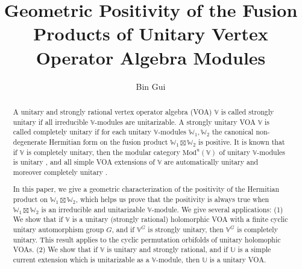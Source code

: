 \documentclass[11pt,b5paper,notitlepage]{article}
\title{Geometric Positivity of the Fusion Products of Unitary Vertex Operator Algebra Modules}
\author{{\sc Bin Gui}
}
\date{}
\theoremstyle{definition}
\theoremstyle{plain}
\newcommand{\uni}{\mathrm{u}}
\newcommand{\Vbb}{\mathbb V}
\newcommand{\Ubb}{\mathbb U}
\newcommand{\Wbb}{\mathbb W}
\newcommand{\Mod}{\mathrm{Mod}}
\numberwithin{equation}{section}
\begin{document}
\sloppy %
	\setcounter{section}{-1}
	






	
	\maketitle

\begin{abstract}
A unitary and strongly rational vertex operator algebra (VOA) $\Vbb$ is called strongly unitary if all irreducible $\Vbb$-modules are unitarizable. A strongly unitary VOA $\Vbb$ is called completely unitary if for each unitary $\Vbb$-modules $\Wbb_1,\Wbb_2$ the canonical non-degenerate Hermitian form on the fusion product $\Wbb_1\boxtimes\Wbb_2$ is positive. It is known that if $\Vbb$ is completely unitary, then the  modular category $\Mod^\uni(\Vbb)$ of unitary $\Vbb$-modules is unitary \cite{Gui19b}, and all simple VOA extensions of $\Vbb$ are automatically unitary and moreover completely unitary \cite{Gui22,CGGH23}.

In this paper, we give a geometric characterization of the positivity of the Hermitian product on $\Wbb_1\boxtimes\Wbb_2$, which helps us prove that the positivity is always true when $\Wbb_1\boxtimes\Wbb_2$ is an irreducible and unitarizable $\Vbb$-module. We give several applications: (1) We show that if $\Vbb$ is a unitary (strongly rational) holomorphic VOA with a finite cyclic unitary automorphism group $G$, and if $\Vbb^G$ is strongly unitary, then $\Vbb^G$ is completely unitary. This result applies to the cyclic permutation orbifolds of unitary holomophic VOAs. (2) We show that if $\Vbb$ is unitary and strongly rational, and if $\Ubb$ is a simple current extension which is unitarizable as a $\Vbb$-module, then $\Ubb$ is a unitary VOA.
\end{abstract}




\begin{comment}
\makeatletter
\newcommand*{\toccontents}{\@starttoc{toc}}
\makeatother
\toccontents
\end{comment}
\end{document}
